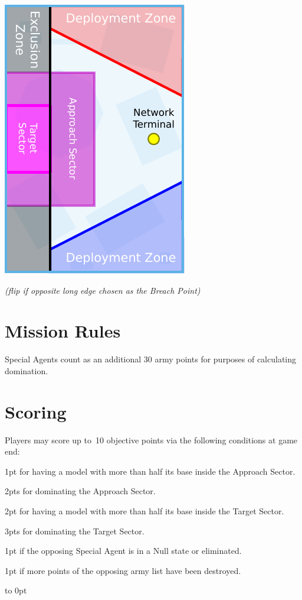 \begin{minipage}[t]{2in}\centering
\vspace{4pt}   
\includegraphics{maps/map-breachpoint}

\medskip\small%
\emph{(flip if opposite long edge chosen as the Breach Point)}
\end{minipage}

\section{Mission Rules}

Special Agents count as an additional 30 army points for purposes of
calculating domination.

\section{Scoring}

Players may score up to~10 objective points via the following
conditions at game end:
\begin{squishitemize}
\item 1pt for having a model with more than half its base inside the
  Approach Sector.
\item 2pts for dominating the Approach Sector.
\item 2pt for having a model with more than half its base inside the
  Target Sector.
\item 3pts for dominating the Target Sector.
\item 1pt if the opposing Special Agent is in a Null state or eliminated.
\item 1pt if more points of the opposing army list have been destroyed.
\end{squishitemize}

\vfill
\vbox to 0pt{}